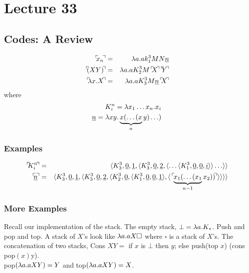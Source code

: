 \chapter{Lecture 33}

\section{Codes: A Review}
\begin{eqnarray*}
  \godnum{x_n} &=& \l a.ak_1^3MN\uline{n}\\
  \godnum{(XY)} &=& \l a.aK_2^3M\godnum{X}\godnum{Y}\\
  \godnum{\l x.X} &=& \l a.aK_3^3M\uline{n}\godnum{X}\\
\end{eqnarray*}
where
\begin{eqnarray*}
  K_i^n = \l x_1\ldots x_n.x_i\\
  \uline{n} = \l xy.\underbrace{x(\ldots (x}_{n}y)\ldots)
\end{eqnarray*}

\subsection{Examples}
\begin{eqnarray*}
  \godnum{K_i^n} &=& \langle K_3^3, \uline{0}, \uline{1}, \langle K_3^3, \uline{0}, \uline{2}, \langle \ldots \langle K_1^3, \uline{0}, \uline{0}, \uline{i} \rangle \rangle \ldots \rangle \rangle\\
  \godnum{\uline{n}} &=& \langle K_3^3, \uline{0}, \uline{1}, \langle K_3^3, \uline{0}, \uline{2}, \langle K_2^3, \uline{0}, \langle K_1^3, \uline{0}, \uline{0}, \uline{1} \rangle, \langle \godnum{\underbrace{x_1(\ldots(x_1}_{n-1}x_2))} \rangle \rangle \rangle \rangle
\end{eqnarray*}

\subsection{More Examples}
Recall our implementation of the stack. The empty stack, $\bot = \lambda a.K_*$. Push and pop and top. A stack of $X$'s look like $\lambda a.aX\square$ where $\square$ is a stack of $X$'s. The concatenation of two stacks, Cons $XY = $ if $x$ is $\bot$ then $y$; else push(top $x$) (cons pop$(x)$y).\\

pop$(\lambda a.aXY) = Y$ and top$(\lambda a.aXY) = X$.\\

